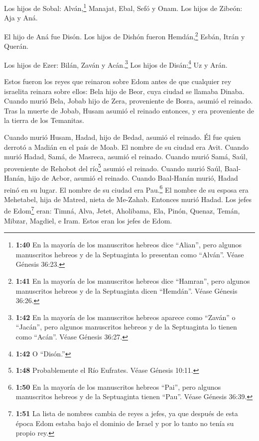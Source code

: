  Los hijos de Sobal: Alván,\footnote{\textbf{1:40} En la
  mayoría de los manuscritos hebreos dice ``Alian'', pero algunos
  manuscritos hebreos y de la Septuaginta lo presentan como ``Alván''.
  Véase Génesis 36:23.} Manajat, Ebal, Sefó y Onam. Los hijos de Zibeón:
Aja y Aná.

 El hijo de Aná fue Disón. Los hijos de Dishón fueron
Hemdán,\footnote{\textbf{1:41} En la mayoría de los manuscritos hebreos
  dice ``Hamran'', pero algunos manuscritos hebreos y de la Septuaginta
  dicen ``Hemdán''. Véase Génesis 36:26.} Esbán, Itrán y Querán.

 Los hijos de Ezer: Bilán, Zaván y Acán.\footnote{\textbf{1:42}
  En la mayoría de los manuscritos hebreos aparece como ``Zaván'' o
  ``Jacán'', pero algunos manuscritos hebreos y de la Septuaginta lo
  tienen como ``Acán''. Véase Génesis 36:27.} Los hijos de
Disán:\footnote{\textbf{1:42} O ``Disón.''} Uz y Arán.

 Estos fueron los reyes que reinaron sobre Edom antes de
que cualquier rey israelita reinara sobre ellos: Bela hijo de Beor, cuya
ciudad se llamaba Dinaba.  Cuando murió Bela, Jobab hijo de
Zera, proveniente de Bosra, asumió el reinado.  Tras la
muerte de Jobab, Husam asumió el reinado entonces, y era proveniente de
la tierra de los Temanitas.

 Cuando murió Husam, Hadad, hijo de Bedad, asumió el
reinado. Él fue quien derrotó a Madián en el país de Moab. El nombre de
su ciudad era Avit.  Cuando murió Hadad, Samá, de Masreca,
asumió el reinado.  Cuando murió Samá, Saúl, proveniente de
Rehobot del río\footnote{\textbf{1:48} Probablemente el Río Eufrates.
  Véase Génesis 10:11.} asumió el reinado.  Cuando murió
Saúl, Baal-Hanán, hijo de Acbor, asumió el reinado.  Cuando
Baal-Hanán murió, Hadad reinó en su lugar. El nombre de su ciudad era
Pau.\footnote{\textbf{1:50} En la mayoría de los manuscritos hebreos
  ``Pai'', pero algunos manuscritos hebreos y de la Septuaginta tienen
  ``Pau''. Véase Génesis 36:39.} El nombre de su esposa era Mehetabel,
hija de Matred, nieta de Me-Zahab.  Entonces murió Hadad.
Los jefes de Edom\footnote{\textbf{1:51} La lista de nombres cambia de
  reyes a jefes, ya que después de esta época Edom estaba bajo el
  dominio de Israel y por lo tanto no tenía su propio rey.} eran: Timná,
Alva, Jetet,  Aholibama, Ela, Pinón,  Quenaz,
Temán, Mibzar,  Magdiel, e Iram. Estos eran los jefes de
Edom.

